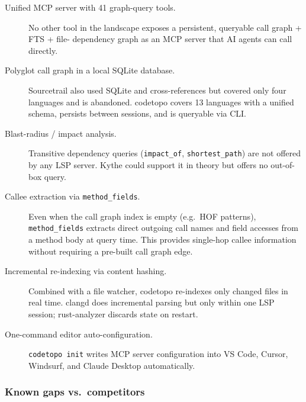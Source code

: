 \begin{description}
  \item[Unified MCP server with 41 graph-query tools.] No other tool in the
        landscape exposes a persistent, queryable call graph + FTS + file-
        dependency graph as an MCP server that AI agents can call directly.
  \item[Polyglot call graph in a local SQLite database.] Sourcetrail also used
        SQLite and cross-references but covered only four languages and is
        abandoned. codetopo covers 13 languages with a unified schema, persists
        between sessions, and is queryable via CLI.
  \item[Blast-radius / impact analysis.] Transitive dependency queries
        (\texttt{impact\_of}, \texttt{shortest\_path}) are not offered by any
        LSP server. Kythe could support it in theory but offers no out-of-box
        query.
  \item[Callee extraction via \texttt{method\_fields}.] Even when the call graph
        index is empty (e.g.\ HOF patterns), \texttt{method\_fields} extracts
        direct outgoing call names and field accesses from a method body at
        query time. This provides single-hop callee information without
        requiring a pre-built call graph edge.
  \item[Incremental re-indexing via content hashing.] Combined with a file
        watcher, codetopo re-indexes only changed files in real time. clangd
        does incremental parsing but only within one LSP session; rust-analyzer
        discards state on restart.
  \item[One-command editor auto-configuration.] \texttt{codetopo init} writes
        MCP server configuration into VS Code, Cursor, Windsurf, and Claude
        Desktop automatically.
\end{description}

\subsubsection{Known gaps vs.\ competitors}

